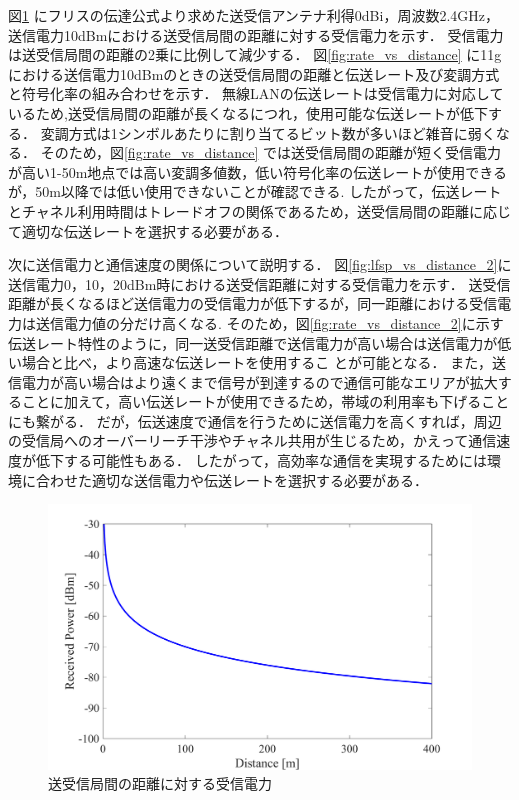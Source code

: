 \documentclass[a4paper,10.5pt]{ltjsarticle}
\begin{document}
図\ref{fig:Received power_vs_distance} にフリスの伝達公式より求めた送受信アンテナ利得0dBi，周波数2.4GHz，送信電力10dBmにおける送受信局間の距離に対する受信電力を示す．
受信電力は送受信局間の距離の2乗に比例して減少する．
図\ref{fig:rate_vs_distance} に11gにおける送信電力10dBmのときの送受信局間の距離と伝送レート及び変調方式と符号化率の組み合わせを示す．
無線LANの伝送レートは受信電力に対応しているため,送受信局間の距離が長くなるにつれ，使用可能な伝送レートが低下する．
変調方式は1シンボルあたりに割り当てるビット数が多いほど雑音に弱くなる．
そのため，図\ref{fig:rate_vs_distance} では送受信局間の距離が短く受信電力が高い1-50m地点では高い変調多値数，低い符号化率の伝送レートが使用できるが，50m以降では低い使用できないことが確認できる.
したがって，伝送レートとチャネル利用時間はトレードオフの関係であるため，送受信局間の距離に応じて適切な伝送レートを選択する必要がある．\par
次に送信電力と通信速度の関係について説明する．
図\ref{fig:lfsp_vs_distance_2}に送信電力0，10，20dBm時における送受信距離に対する受信電力を示す．
送受信距離が長くなるほど送信電力の受信電力が低下するが，同一距離における受信電力は送信電力値の分だけ高くなる.
そのため，図\ref{fig:rate_vs_distance_2}に示す伝送レート特性のように，同一送受信距離で送信電力が高い場合は送信電力が低い場合と比べ，より高速な伝送レートを使用するこ
とが可能となる．
また，送信電力が高い場合はより遠くまで信号が到達するので通信可能なエリアが拡大することに加えて，高い伝送レートが使用できるため，帯域の利用率も下げることにも繋がる．
だが，伝送速度で通信を行うために送信電力を高くすれば，周辺の受信局へのオーバーリーチ干渉やチャネル共用が生じるため，かえって通信速度が低下する可能性もある．
したがって，高効率な通信を実現するためには環境に合わせた適切な送信電力や伝送レートを選択する必要がある．


\begin{figure}[H]
  \centering
  \includegraphics[width=\linewidth]{lfsp_vs_distance.pdf} %
  \caption{送受信局間の距離に対する受信電力}
  \label{fig:Received power_vs_distance} %
\end{figure}
\end{document}
